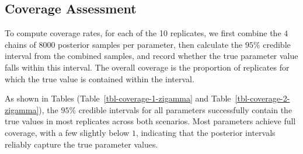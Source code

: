 \documentclass[
  letterpaper,
  double,
  12pt,
  1.0in]{beavtex}
\begin{document}
\subsection{Coverage Assessment}\label{coverage-assessment-1}

To compute coverage rates, for each of the 10 replicates, we first
combine the \(4\) chains of \(8000\) posterior samples per parameter,
then calculate the \(95\%\) credible interval from the combined samples,
and record whether the true parameter value falls within this interval.
The overall coverage is the proportion of replicates for which the true
value is contained within the interval.

As shown in Tables (Table~\ref{tbl-coverage-1-zigamma} and
Table~\ref{tbl-coverage-2-zigamma}), the \(95\%\) credible intervals for
all parameters successfully contain the true values in most replicates
across both scenarios. Most parameters achieve full coverage, with a few
slightly below \(1\), indicating that the posterior intervals reliably
capture the true parameter values.

\begin{table}

\caption{\label{tbl-coverage-1-zigamma}Coverage Rates for All Parameters Across 10 Replicates for Scenario 1 (varying $P$ and $\epsilon$), with true parameter values fixed at $\mu = 7$ and $\beta = 1$. The table includes all combinations of $P = 0.1, 0.5, 0.7$ and $\epsilon = 0.1, 0.4$. Specifically, the top two rows correspond to $P = 0.1$ with $\epsilon = 0.1$ and $0.4$; the middle two rows to $P = 0.5$ with $\epsilon = 0.1$ and $0.4$; and the final two rows to $P = 0.7$ with $\epsilon = 0.1$ and $0.4$.}


\end{table}%
\end{document}
